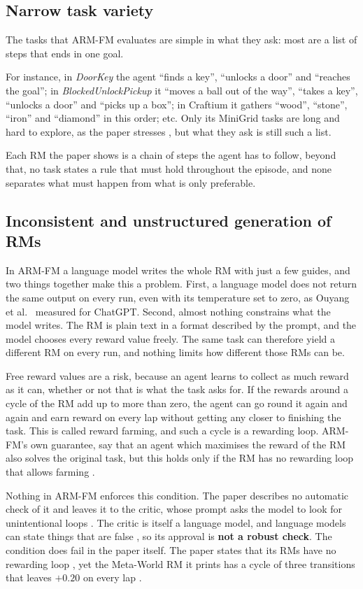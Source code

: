 \documentclass[11pt,english,listoffigures,listoftables]{tfgetsinf}
\newcommand{\env}[1]{\textsf{\slshape #1}}  %
\begin{document}
\subsection{Narrow task variety}
The tasks that ARM-FM evaluates are simple in what they ask: most are a list of steps that ends in one goal. 

For instance, in \env{DoorKey} the agent ``finds a key'', ``unlocks a door'' and ``reaches the goal''; in \env{BlockedUnlockPickup} it ``moves a ball out of the way'', ``takes a key'', ``unlocks a door'' and ``picks up a box''; in Craftium it gathers ``wood'', ``stone'', ``iron'' and ``diamond'' in this order; etc. Only its MiniGrid tasks are long and hard to explore, as the paper stresses \cite[pp.~5, 14]{creus2026armfm}, but what they ask is still such a list. 

Each RM the paper shows is a chain of steps the agent has to follow, beyond that, no task states a rule that must hold throughout the episode, and none separates what must happen from what is only preferable. 

\subsection{Inconsistent and unstructured generation of RMs}
In ARM-FM a language model writes the whole RM with just a few guides, and two things together make this a problem. First, a language model does not return the same output on every run, even with its temperature set to zero, as Ouyang et al.~\cite{ouyang2025empirical} measured for ChatGPT. Second, almost nothing constrains what the model writes. The RM is plain text in a format described by the prompt, and the model chooses every reward value freely. The same task can therefore yield a different RM on every run, and nothing limits how different those RMs can be.

Free reward values are a risk, because an agent learns to collect as much reward as it can, whether or not that is what the task asks for. If the rewards around a cycle of the RM add up to more than zero, the agent can go round it again and again and earn reward on every lap without getting any closer to finishing the task. This is called reward farming, and such a cycle is a rewarding loop. ARM-FM's own guarantee, say that an agent which maximises the reward of the RM also solves the original task, but this holds only if the RM has no rewarding loop that allows farming \cite[p.~21]{creus2026armfm}. 

Nothing in ARM-FM enforces this condition. The paper describes no automatic check of it and leaves it to the critic, whose prompt asks the model to look for unintentional loops \cite[p.~27]{creus2026armfm}. The critic is itself a language model, and language models can state things that are false \cite{huang2025survey}, so its approval is \textbf{not a robust check}. The condition does fail in the paper itself. The paper states that its RMs have no rewarding loop \cite[p.~21]{creus2026armfm}, yet the Meta-World RM it prints has a cycle of three transitions that leaves $+0.20$ on every lap \cite[p.~32]{creus2026armfm}.
\end{document}
